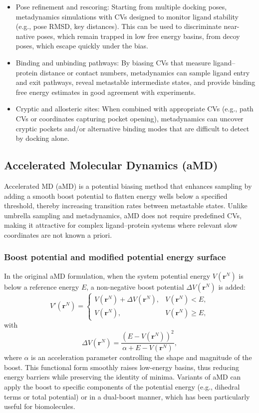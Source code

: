 \documentclass[12pt]{article}
\begin{document}
\begin{itemize}
\item Pose refinement and rescoring: Starting from multiple docking poses, metadynamics simulations with CVs designed to monitor ligand stability (e.g., pose RMSD, key distances). This can be used to discriminate near-native poses, which remain trapped in low free energy basins, from decoy poses, which escape quickly under the bias.\cite{CH9_clark2016}
\item Binding and unbinding pathways: By biasing CVs that measure ligand--protein distance or contact numbers, metadynamics can sample ligand entry and exit pathways, reveal metastable intermediate states, and provide binding free energy estimates in good agreement with experiments.\cite{CH9_Tiwary2015,CH9_Callea2021}
\item Cryptic and allosteric sites: When combined with appropriate CVs (e.g., path CVs or coordinates capturing pocket opening), metadynamics can uncover cryptic pockets and/or alternative binding modes that are difficult to detect by docking alone.
\end{itemize}

\subsection{Accelerated Molecular Dynamics (aMD)}

Accelerated MD (aMD) is a potential biasing method that enhances sampling by adding a smooth boost potential to flatten energy wells below a specified threshold, thereby increasing transition rates between metastable states.\cite{CH9_Hamelberg2004,CH9_Markwick2011} Unlike umbrella sampling and metadynamics, aMD does not require predefined CVs, making it attractive for complex ligand--protein systems where relevant slow coordinates are not known a priori.

\subsubsection{Boost potential and modified potential energy surface}

In the original aMD formulation, when the system potential energy $V(\mathbf{r}^N)$ is below a reference energy $E$, a non-negative boost potential $\Delta V(\mathbf{r}^N)$ is added:
\[
V'(\mathbf{r}^N) =
\begin{cases}
V(\mathbf{r}^N) + \Delta V(\mathbf{r}^N), & V(\mathbf{r}^N) < E, \\
V(\mathbf{r}^N), & V(\mathbf{r}^N) \geq E,
\end{cases}
\]
with
\[
\Delta V(\mathbf{r}^N) = \frac{\left(E - V(\mathbf{r}^N)\right)^2}{\alpha + E - V(\mathbf{r}^N)},
\]
where $\alpha$ is an acceleration parameter controlling the shape and magnitude of the boost.\cite{CH9_Hamelberg2004} This functional form smoothly raises low-energy basins, thus reducing energy barriers while preserving the identity of minima. Variants of aMD can apply the boost to specific components of the potential energy (e.g., dihedral terms or total potential) or in a dual-boost manner, which has been particularly useful for biomolecules.\cite{CH9_Markwick2011}
\end{document}

